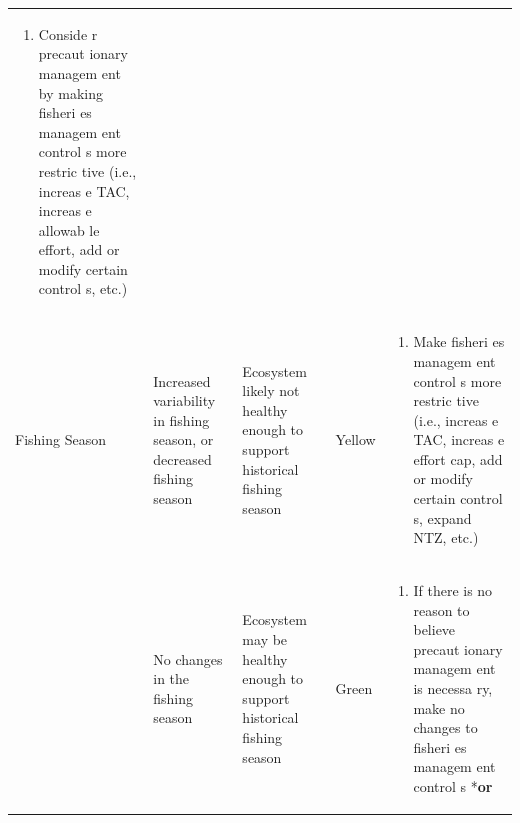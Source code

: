 \documentclass[]{book}
\providecommand{\tightlist}{%
  \setlength{\itemsep}{0pt}\setlength{\parskip}{0pt}}
\begin{document}
\begin{longtable}[]{@{}lllll@{}}
\begin{minipage}[t]{0.19\columnwidth}
\begin{enumerate}
\def\labelenumi{\arabic{enumi}.}
\setcounter{enumi}{1}
\tightlist
\item
  Conside r precaut ionary managem ent by making fisheri es managem ent
  control s more restric tive (i.e., increas e TAC, increas e allowab le
  effort, add or modify certain control s, etc.)
\end{enumerate}\strut
\end{minipage}\tabularnewline
\begin{minipage}[t]{0.19\columnwidth}\raggedright\strut
Fishing Season\strut
\end{minipage} & \begin{minipage}[t]{0.19\columnwidth}\raggedright\strut
Increased variability in fishing season, or decreased fishing
season\strut
\end{minipage} & \begin{minipage}[t]{0.19\columnwidth}\raggedright\strut
Ecosystem likely not healthy enough to support historical fishing
season\strut
\end{minipage} & \begin{minipage}[t]{0.19\columnwidth}\raggedright\strut
Yellow\strut
\end{minipage} & \begin{minipage}[t]{0.19\columnwidth}\raggedright\strut
\begin{enumerate}
\def\labelenumi{\arabic{enumi}.}
\tightlist
\item
  Make fisheri es managem ent control s more restric tive (i.e., increas
  e TAC, increas e effort cap, add or modify certain control s, expand
  NTZ, etc.)
\end{enumerate}\strut
\end{minipage}\tabularnewline
\begin{minipage}[t]{0.19\columnwidth}\raggedright\strut
\strut
\end{minipage} & \begin{minipage}[t]{0.19\columnwidth}\raggedright\strut
No changes in the fishing season\strut
\end{minipage} & \begin{minipage}[t]{0.19\columnwidth}\raggedright\strut
Ecosystem may be healthy enough to support historical fishing
season\strut
\end{minipage} & \begin{minipage}[t]{0.19\columnwidth}\raggedright\strut
Green\strut
\end{minipage} & \begin{minipage}[t]{0.19\columnwidth}\raggedright\strut
\begin{enumerate}
\def\labelenumi{\arabic{enumi}.}
\tightlist
\item
  If there is no reason to believe precaut ionary managem ent is necessa
  ry, make no changes to fisheri es managem ent control s *\textbf{or}
\end{enumerate}


\end{minipage}
\end{longtable}
\end{document}
